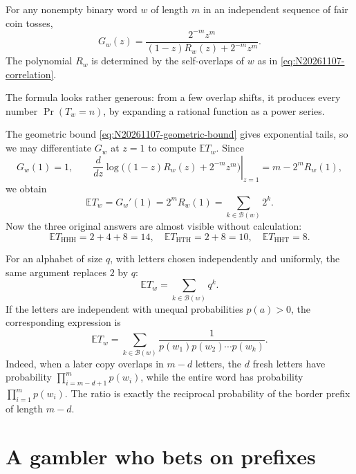 \begin{theorem}
For any nonempty binary word \(w\) of length \(m\) in an independent sequence of fair coin tosses,
\begin{equation}
 \boxed{\displaystyle
 G_w(z)=
 \frac{2^{-m}z^m}
 {(1-z)R_w(z)+2^{-m}z^m}.}
 \label{eq:N20261107-generating-function}
\end{equation}
The polynomial \(R_w\) is determined by the self-overlaps of \(w\) as in \eqref{eq:N20261107-correlation}.
\end{theorem}

The formula looks rather generous: from a few overlap shifts, it produces every number \(\Pr(T_w=n)\), by expanding a rational function as a power series.

The geometric bound \eqref{eq:N20261107-geometric-bound} gives exponential tails, so we may differentiate \(G_w\) at \(z=1\) to compute \(\mathbb E T_w\). Since
\[
 G_w(1)=1,\qquad
 \left.\frac{d}{dz}\log\bigl((1-z)R_w(z)+2^{-m}z^m\bigr)
 \right|_{z=1}=m-2^mR_w(1),
\]
we obtain
\begin{equation}
 \boxed{\displaystyle
 \mathbb E T_w=G_w'(1)=2^mR_w(1)
 =\sum_{k\in\mathcal B(w)}2^k.}
 \label{eq:N20261107-border-mean}
\end{equation}
Now the three original answers are almost visible without calculation:
\[
 \mathbb E T_{\mathrm{HHH}}=2+4+8=14,\quad
 \mathbb E T_{\mathrm{HTH}}=2+8=10,\quad
 \mathbb E T_{\mathrm{HHT}}=8.
\]

For an alphabet of size \(q\), with letters chosen independently and uniformly, the same argument replaces \(2\) by \(q\):
\[
 \mathbb E T_w=\sum_{k\in\mathcal B(w)}q^k.
\]
If the letters are independent with unequal probabilities \(p(a)>0\), the corresponding expression is
\begin{equation}
 \mathbb E T_w=
 \sum_{k\in\mathcal B(w)}
 \frac{1}{p(w_1)p(w_2)\cdots p(w_k)}.
 \label{eq:N20261107-biased}
\end{equation}
Indeed, when a later copy overlaps in \(m-d\) letters, the \(d\) fresh letters have probability \(\prod_{i=m-d+1}^{m}p(w_i)\), while the entire word has probability \(\prod_{i=1}^mp(w_i)\). The ratio is exactly the reciprocal probability of the border prefix of length \(m-d\).

\section{A gambler who bets on prefixes}

